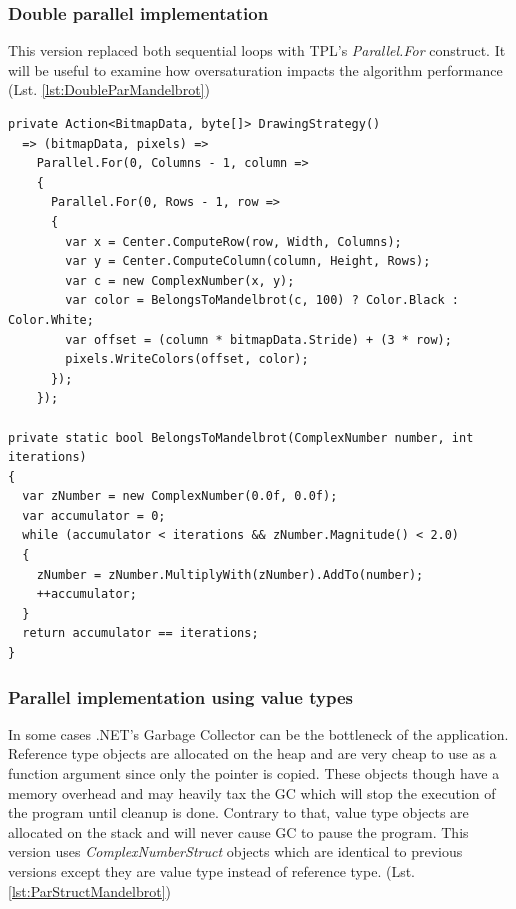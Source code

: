 \subsubsection{Double parallel implementation}
This version replaced both sequential loops with TPL's \emph{Parallel.For} construct. It will be useful to examine how oversaturation impacts the algorithm performance (Lst. \ref{lst:DoubleParMandelbrot})

\begin{lstlisting}[style=sharpcstyle, caption={Double parallel Mandelbrot algorithm}, label={lst:DoubleParMandelbrot}]
private Action<BitmapData, byte[]> DrawingStrategy()
  => (bitmapData, pixels) =>
    Parallel.For(0, Columns - 1, column =>
    {
      Parallel.For(0, Rows - 1, row =>
      {
        var x = Center.ComputeRow(row, Width, Columns);
        var y = Center.ComputeColumn(column, Height, Rows);
        var c = new ComplexNumber(x, y);
        var color = BelongsToMandelbrot(c, 100) ? Color.Black : Color.White;
        var offset = (column * bitmapData.Stride) + (3 * row);
        pixels.WriteColors(offset, color);
      });
    });

private static bool BelongsToMandelbrot(ComplexNumber number, int iterations)
{
  var zNumber = new ComplexNumber(0.0f, 0.0f);
  var accumulator = 0;
  while (accumulator < iterations && zNumber.Magnitude() < 2.0)
  {
    zNumber = zNumber.MultiplyWith(zNumber).AddTo(number);
    ++accumulator;
  }
  return accumulator == iterations;
}
\end{lstlisting}

\subsubsection{Parallel implementation using value types}

In some cases .NET's Garbage Collector can be the bottleneck of the application. Reference type objects are allocated on the heap and are very cheap to use as a function argument since only the pointer is copied. These objects though have a memory overhead and may heavily tax the GC which will stop the execution of the program until cleanup is done. Contrary to that, value type objects are allocated on the stack and will never cause GC to pause the program. This version uses \emph{ComplexNumberStruct} objects which are identical to previous versions except they are value type instead of reference type.  (Lst. \ref{lst:ParStructMandelbrot})

